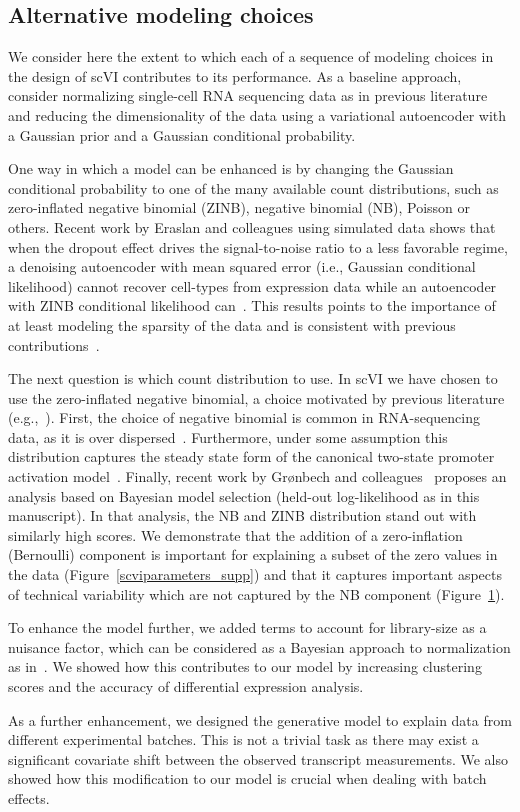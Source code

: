 \begin{figure}
\label{scvinoise-model}
\end{figure}


\subsection{Alternative modeling choices}
We consider here the extent to which each of a sequence of modeling choices in the design of scVI contributes to its performance. As a baseline approach, consider normalizing single-cell RNA sequencing data as in previous literature~\cite{zifa} and reducing the dimensionality of the data using a variational autoencoder with a Gaussian prior and a Gaussian conditional probability. 
    
One way in which a model can be enhanced is by changing the Gaussian conditional probability to one of the many available count distributions, such as zero-inflated negative binomial (ZINB), negative binomial (NB), Poisson or others. Recent work by Eraslan and colleagues using simulated data shows that when the dropout effect drives the signal-to-noise ratio to a less favorable regime, a denoising autoencoder with mean squared error (i.e., Gaussian conditional likelihood) cannot recover cell-types from expression data while an autoencoder with ZINB conditional likelihood can~\cite{dca}. This results points to the importance of at least modeling the sparsity of the data and is consistent with previous contributions~\cite{zifa,zinbwave}. 
    
The next question is which count distribution to use. In scVI we have chosen to use the zero-inflated negative binomial, a choice motivated by previous literature (e.g.,~\cite{zinbwave}). First, the choice of negative binomial is common in RNA-sequencing data, as it is over dispersed~\cite{deseq2}. Furthermore, under some assumption this distribution captures the steady state form of the canonical two-state promoter activation model~\cite{Grun2014}. Finally, recent work by Gr{\o}nbech and colleagues~\cite{scVAE} proposes an analysis based on Bayesian model selection (held-out log-likelihood as in this manuscript). In that analysis, the NB and ZINB distribution stand out with similarly high scores. We demonstrate that the addition of a zero-inflation (Bernoulli) component is important for explaining a subset of the zero values in the data (Figure~\ref{scviparameters_supp}) and that it captures important aspects of technical variability which are not captured by the NB component (Figure~\ref{scvinoise-model}).
    
To enhance the model further, we added terms to account for library-size as a nuisance factor, which can be considered as a Bayesian approach to normalization as in~\cite{biscuit,basics}. We showed how this contributes to our model by increasing clustering scores and the accuracy of differential expression analysis.
    
As a further enhancement, we designed the generative model to explain data from different experimental batches. This is not a trivial task as there may exist a significant covariate shift between the observed transcript measurements. We also showed how this modification to our model is crucial when dealing with batch effects.